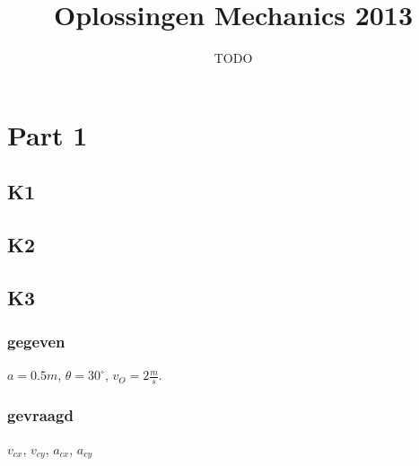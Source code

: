 \documentclass[10pt,a4paper]{article}
\title{Oplossingen Mechanics 2013}
\author{TODO}
\begin{document}
\maketitle
\pagebreak
\tableofcontents
\pagebreak


\section{Part 1}
\subsection{K1}

\subsection{K2}

\subsection{K3}
\subsubsection*{gegeven}
$a=0.5m$, $\theta=30^\circ$, $v_O=2\frac{m}{s}$.
\subsubsection*{gevraagd}
$v_{cx}$, $v_{cy}$, $a_{cx}$, $a_{cy}$
\end{document}
